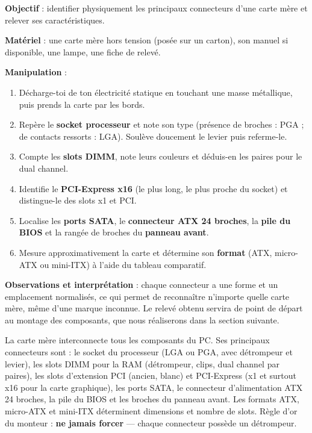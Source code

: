 \documentclass[11pt]{article}
\newcommand{\cle}[1]{{\popxbold\color{popdark}#1}}
\begin{document}
\begin{experience}
\textbf{Objectif} : identifier physiquement les principaux connecteurs d'une carte mère et relever ses caractéristiques.

\textbf{Matériel} : une carte mère hors tension (posée sur un carton), son manuel si disponible, une lampe, une fiche de relevé.

\textbf{Manipulation} :
\begin{enumerate}
  \item Décharge-toi de ton électricité statique en touchant une masse métallique, puis prends la carte par les bords.
  \item Repère le \textbf{socket processeur} et note son type (présence de broches : PGA ; de contacts ressorts : LGA). Soulève doucement le levier puis referme-le.
  \item Compte les \textbf{slots DIMM}, note leurs couleurs et déduis-en les paires pour le dual channel.
  \item Identifie le \textbf{PCI-Express x16} (le plus long, le plus proche du socket) et distingue-le des slots x1 et PCI.
  \item Localise les \textbf{ports SATA}, le \textbf{connecteur ATX 24 broches}, la \textbf{pile du BIOS} et la rangée de broches du \textbf{panneau avant}.
  \item Mesure approximativement la carte et détermine son \textbf{format} (ATX, micro-ATX ou mini-ITX) à l'aide du tableau comparatif.
\end{enumerate}

\textbf{Observations et interprétation} : chaque connecteur a une forme et un emplacement normalisés, ce qui permet de reconnaître n'importe quelle carte mère, même d'une marque inconnue. Le relevé obtenu servira de point de départ au montage des composants, que nous réaliserons dans la section suivante.
\end{experience}

\begin{aretenir}
La carte mère interconnecte tous les composants du PC. Ses principaux connecteurs sont : le \cle{socket} du processeur (LGA ou PGA, avec détrompeur et levier), les slots \cle{DIMM} pour la RAM (détrompeur, clips, dual channel par paires), les slots d'extension \cle{PCI} (ancien, blanc) et \cle{PCI-Express} (x1 et surtout x16 pour la carte graphique), les ports \cle{SATA}, le connecteur d'alimentation \cle{ATX 24 broches}, la \cle{pile du BIOS} et les broches du \cle{panneau avant}. Les formats \cle{ATX}, \cle{micro-ATX} et \cle{mini-ITX} déterminent dimensions et nombre de slots. Règle d'or du monteur : \textbf{ne jamais forcer} — chaque connecteur possède un détrompeur.
\end{aretenir}
\end{document}
